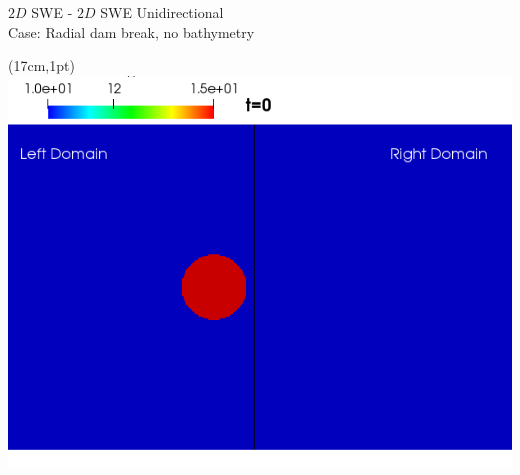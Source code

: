 \begin{frame}

\end{frame}

\begin{frame}
\vspace{-0.5cm}
{\large \hspace{3mm} $2D$ SWE - $2D$ SWE Unidirectional}\\
Case: Radial dam break, no bathymetry
\begin{textblock*}{1cm}(17cm,1pt) %
\includegraphics[scale=0.22]{./Resources/Images/unidirectional0_g_0.png}
\end{textblock*}


\end{frame}
